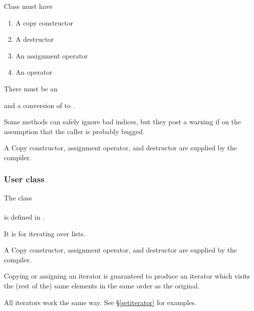 
\noindent Class  must have

\begin{enumerate}
\item
A copy constructor
\item
A destructor
\item
An assignment operator
\item
An \code{==} operator
\end{enumerate}

\noindent There must be an


and a conversion of  to .

\noindent Some  methods can safely ignore bad indices,
but they post a warning if  on the assumption that
the caller is probably bugged.

\noindent A Copy constructor, assignment operator,
and destructor are supplied by the compiler.


\subsubsection{User class }


\noindent The class\\
\\
is defined in .

It is for iterating over lists.



\noindent A Copy constructor, assignment operator,
and destructor are supplied by the compiler.

\noindent Copying or assigning an iterator is guaranteed to produce an
iterator which visits the (rest of the) same elements in the
same order as the original.

\noindent All iterators work the same way. See \S\ref{setiterator} for examples.


